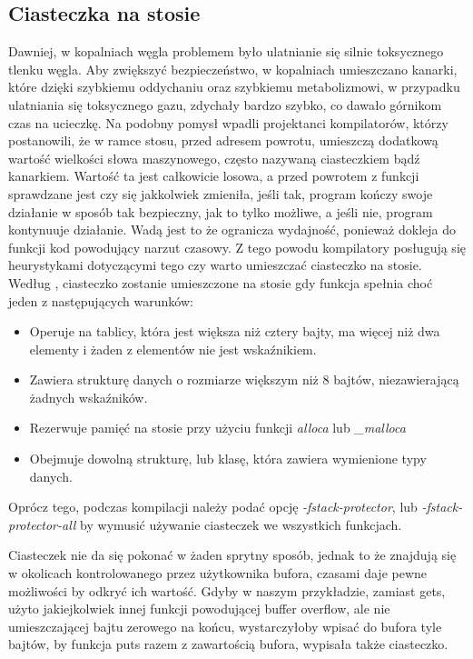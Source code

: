 \documentclass[polish]{kbk}
\begin{document}
\subsection{Ciasteczka na stosie}
Dawniej, w kopalniach węgla problemem było ulatnianie się silnie toksycznego 
tlenku węgla. Aby zwiększyć bezpieczeństwo, w kopalniach umieszczano kanarki, 
które dzięki szybkiemu oddychaniu oraz szybkiemu metabolizmowi, w przypadku 
ulatniania się toksycznego gazu, zdychały bardzo szybko, co dawało górnikom czas 
na ucieczkę. Na podobny pomysł wpadli projektanci kompilatorów, którzy postanowili, 
że w ramce stosu, przed adresem powrotu, umieszczą dodatkową wartość wielkości słowa
maszynowego, często nazywaną ciasteczkiem bądź kanarkiem. Wartość ta jest całkowicie 
losowa, a przed powrotem z funkcji sprawdzane jest czy się jakkolwiek zmieniła, 
jeśli tak, program kończy swoje działanie w sposób tak bezpieczny, jak to tylko 
możliwe, a jeśli nie, program kontynuuje działanie. Wadą jest to że ogranicza 
wydajność, ponieważ dokleja do funkcji kod powodujący narzut czasowy. Z tego 
powodu kompilatory posługują się heurystykami dotyczącymi tego czy warto umieszczać
ciasteczko na stosie. Według \cite{cookie}, ciasteczko zostanie umieszczone na
stosie gdy funkcja spełnia choć jeden z następujących warunków:
\begin{itemize}
\item Operuje na tablicy, która jest większa niż cztery bajty, ma więcej niż dwa 
elementy i żaden z elementów nie jest wskaźnikiem.
\item Zawiera strukturę danych o rozmiarze większym niż 8 bajtów, 
niezawierającą żadnych wskaźników.
\item Rezerwuje pamięć na stosie przy użyciu funkcji \emph{alloca} lub 
\emph{\_malloca}
\item Obejmuje dowolną strukturę, lub klasę, która zawiera wymienione typy danych.
\end{itemize}
Oprócz tego, podczas kompilacji należy podać opcję \textit{-fstack-protector}, 
lub \textit{-fstack-protector-all} by wymusić używanie ciasteczek we wszystkich 
funkcjach. 
\par
Ciasteczek nie da się pokonać w żaden sprytny sposób, jednak to że 
znajdują się w okolicach kontrolowanego przez użytkownika bufora, czasami daje 
pewne możliwości by odkryć ich wartość. Gdyby w naszym przykładzie, zamiast
gets, użyto jakiejkolwiek innej funkcji powodującej buffer overflow, ale nie
umieszczającej bajtu zerowego na końcu, wystarczyłoby wpisać do bufora 
tyle bajtów, by funkcja puts razem z zawartością bufora, wypisała także ciasteczko. 
\end{document}
